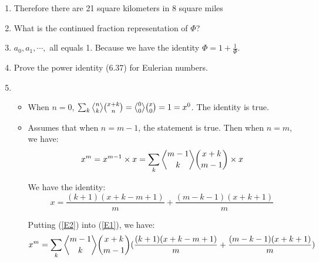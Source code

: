 \documentclass[12pt,a4paper]{article}
\makeatletter
\newtheorem*{solution}{Solution}
\theoremstyle{definition}
\def\bangle{ \atopwithdelims \langle \rangle}
\renewenvironment{solution}[1][Solution] {\par\pushQED{\qed}\normalfont\topsep6\p@\@plus6\p@\relax\trivlist\item[\hskip\labelsep\bfseries#1\@addpunct{.}]\ignorespaces}{\popQED\endtrivlist\@endpefalse} \makeatother
\makeatother
\begin{document}
\begin{enumerate}
\begin{solution}
        	Therefore there are 21 square kilometers in 8 square miles
        \end{solution}
    \item 
        What is the continued fraction representation of $\Phi$?
        \begin{solution}
        	$a_0,a_1,\cdots,$ all equals 1. Because we have the identity $\Phi=1+\frac{1}{\Phi}$.
        \end{solution}
    \item 
        Prove the power identity (6.37) for Eulerian numbers.
        \begin{solution}
        	\ \\
        	\begin{itemize}
        		\item 
        	    	When $n=0$, $\sum_{k}{n \bangle k}\binom{x+k}{n}={0 \bangle 0}\binom{x}{0}=1=x^0$. The identity is true.
        	    \item 
        	        Assumes that when $n=m-1$, the statement is true. Then when $n=m$, we have:
        	        \begin{equation}\label{E1}
        	            x^m=x^{m-1}\times x=\sum_{k}{m-1 \bangle k}\binom{x+k}{m-1} \times x
        	        \end{equation}
        	        
        	        We have the identity:
        	        \begin{equation}\label{E2}
        	            x=\frac{(k+1)(x+k-m+1)}{m}+\frac{(m-k-1)(x+k+1)}{m} 
        	        \end{equation}
        	        
        	        Putting (\ref{E2}) into (\ref{E1}), we have:
        	        \begin{equation}
        	            x^m=\sum_{k} {m-1 \bangle k}\binom{x+k}{m-1}(\frac{(k+1)(x+k-m+1)}{m}+\frac{(m-k-1)(x+k+1)}{m})
        	        \end{equation}
        	        

\end{itemize}
\end{solution}
\end{enumerate}
\end{document}
